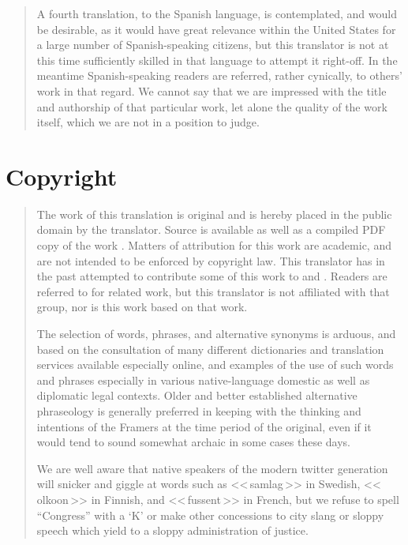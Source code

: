 \documentclass[a4paper,landscape,12pt]{article}
\begin{document}
\begin{abstract}
	A fourth translation, to the Spanish language, is contemplated, and would be desirable, as it would have great relevance within the United States for a large number of Spanish-speaking citizens, but this translator is not at this time sufficiently skilled in that language to attempt it right-off. In the meantime Spanish-speaking readers are referred, rather cynically, to others' work \cite{jpfo-bor-es,wp-bor-es} in that regard. We cannot say that we are impressed with the title and authorship of that particular work, let alone the quality of the work itself, which we are not in a position to judge.
\end{abstract}

\section*{Copyright}

\begin{quote}
The work of this translation is original and is hereby placed in the public domain by the translator. Source \cite{src} is available as well as a compiled PDF copy of the work \cite{doc}. Matters of attribution for this work are academic, and are not intended to be enforced by copyright law. This translator has in the past attempted to contribute some of this work to \cite{wp-bor-sv} and \cite{wp-bor-fi}. Readers are referred to \cite{jpfo-bor} for related work, but this translator is not affiliated with that group, nor is this work based on that work.

	The selection of words, phrases, and alternative synonyms is arduous, and based on the consultation of many different dictionaries and translation services available especially online, and examples of the use of such words and phrases especially in various native-language domestic as well as diplomatic legal contexts. Older and better established alternative phraseology is generally preferred in keeping with the thinking and intentions of the Framers at the time period of the original, even if it would tend to sound somewhat archaic in some cases these days.

	We are well aware that native speakers of the modern twitter generation will snicker and giggle at words such as \foreignlanguage{swedish}{<<\,samlag\,>>} in Swedish, \foreignlanguage{finnish}{<<\,olkoon\,>>} in Finnish, and \foreignlanguage{french}{<<\,fussent\,>>} in French, but we refuse to spell ``Congress'' with a `K' or make other concessions to city slang or sloppy speech which yield to a sloppy administration of justice.
\end{quote}
\end{document}
